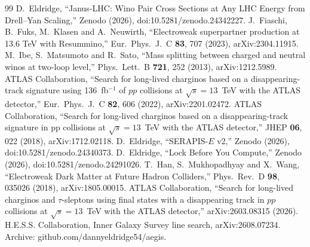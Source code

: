 \documentclass[aps,prd,twocolumn,superscriptaddress,nofootinbib,showkeys]{revtex4-2}
\begin{document}
\begin{thebibliography}{99}
 D.~Eldridge, ``Janus-LHC: Wino Pair Cross Sections at Any LHC Energy from Drell--Yan Scaling,'' Zenodo (2026), doi:10.5281/zenodo.24342227.
 J.~Fiaschi, B.~Fuks, M.~Klasen and A.~Neuwirth, ``Electroweak superpartner production at 13.6 TeV with Resummino,'' Eur.\ Phys.\ J.\ C \textbf{83}, 707 (2023), arXiv:2304.11915.
 M.~Ibe, S.~Matsumoto and R.~Sato, ``Mass splitting between charged and neutral winos at two-loop level,'' Phys.\ Lett.\ B \textbf{721}, 252 (2013), arXiv:1212.5989.
 ATLAS Collaboration, ``Search for long-lived charginos based on a disappearing-track signature using 136~fb$^{-1}$ of $pp$ collisions at $\sqrt s=13$~TeV with the ATLAS detector,'' Eur.\ Phys.\ J.\ C \textbf{82}, 606 (2022), arXiv:2201.02472.
 ATLAS Collaboration, ``Search for long-lived charginos based on a disappearing-track signature in pp collisions at $\sqrt s=13$~TeV with the ATLAS detector,'' JHEP \textbf{06}, 022 (2018), arXiv:1712.02118.
 D.~Eldridge, ``SERAPIS-$E$ v2,'' Zenodo (2026), doi:10.5281/zenodo.24340373.
 D.~Eldridge, ``Lock Before You Compute,'' Zenodo (2026), doi:10.5281/zenodo.24291026.
 T.~Han, S.~Mukhopadhyay and X.~Wang, ``Electroweak Dark Matter at Future Hadron Colliders,'' Phys.\ Rev.\ D \textbf{98}, 035026 (2018), arXiv:1805.00015.
 ATLAS Collaboration, ``Search for long-lived charginos and $\tau$-sleptons using final states with a disappearing track in $pp$ collisions at $\sqrt s=13$~TeV with the ATLAS detector,'' arXiv:2603.08315 (2026).
 H.E.S.S. Collaboration, Inner Galaxy Survey line search, arXiv:2608.07234.
 Archive: github.com/dannyeldridge54/aegis.
\end{thebibliography}
\end{document}
